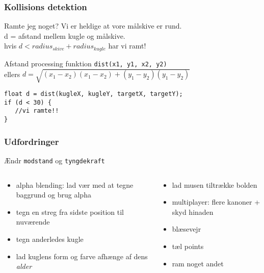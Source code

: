 \documentclass{beamer}
\begin{document}
\begin{frame}[fragile]
  \frametitle{Kollisions detektion}
  \begin{block}{Ramte jeg noget?}
    Vi er heldige at vore målskive er rund.\\
    d = afstand mellem kugle og målskive. \\
    hvis $d < radius_{skive}+radius_{kugle}$ har vi ramt! 
  \end{block}
  \begin{block}{Afstand}
    processing funktion \texttt{dist(x1, y1, x2, y2)} \\
    ellers $d = \sqrt{ (x_1-x_2) (x_1-x_2) + (y_1-y_2)(y_1-y_2)}$
  \end{block}

\begin{verbatim} 
float d = dist(kugleX, kugleY, targetX, targetY);
if (d < 30) {
   //vi ramte!!
}  
\end{verbatim}

\end{frame}




\begin{frame}
  \frametitle{Udfordringer}

  Ændr \texttt{modstand} og \texttt{tyngdekraft}

  \begin{columns}
    \begin{column}{0.5\textwidth}
      \begin{itemize}
      \item alpha blending: lad vær med at tegne baggrund og brug alpha
      \item tegn en streg fra sidste position til nuværende
      \item tegn anderledes kugle
      \item lad kuglens form og farve afhænge af dens \emph{alder}
      \end{itemize}
    \end{column}
    \begin{column}{0.5\textwidth}
      \begin{itemize}
      \item lad musen tiltrække bolden
      \item multiplayer: flere kanoner + skyd hinaden
      \item blæsevejr
      \item tæl points
      \item ram noget andet
      \end{itemize}
    \end{column}
    
  \end{columns}

\end{frame}
\end{document}
